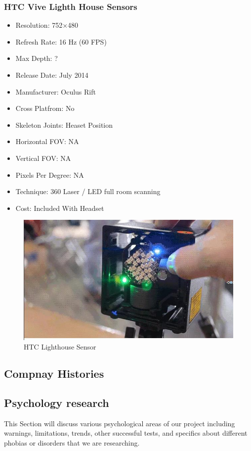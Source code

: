 \documentclass[a4paper,10pt]{article}
\begin{document}
	\subsubsection{HTC Vive Lighth House Sensors}
\begin{itemize}
  \item Resolution: 752×480
  \item Refresh Rate: 16 Hz (60 FPS)
  \item Max Depth: ?
  \item Release Date: July 2014
  \item Manufacturer: Oculus Rift
  \item Cross Platfrom: No
  \item Skeleton Joints: Heaset Position
  \item Horizontal FOV: NA
  \item Vertical FOV: NA
  \item Pixels Per Degree: NA
  \item Technique: 360 Laser / LED full room scanning 
  \item Cost: Included With Headset
\end{itemize}
\begin{figure}[H]
	\includegraphics[width=\linewidth,height=\paperheight,keepaspectratio]{viveLight.jpg}
	\caption{HTC Lighthouse Sensor}
	\label{fig:viveCam}
	\end{figure}
	\pagebreak

\subsection{Compnay Histories}

\subsection {Psychology research}
This Section will discuss various psychological areas of our project including warnings, limitations, trends, other successful tests, and specifics about different phobias or disorders 
that we are researching. 
\end{document}

